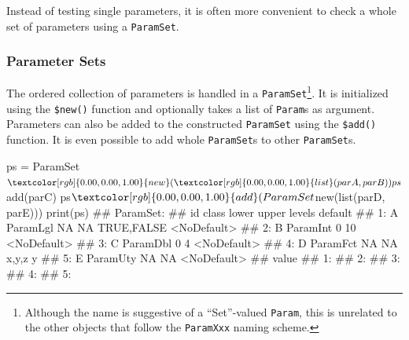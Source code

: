\documentclass[12pt,]{scrbook}
\newenvironment{Shaded}{}{}
\newcommand{\KeywordTok}[1]{\textcolor[rgb]{0.00,0.00,1.00}{#1}}
\newcommand{\NormalTok}[1]{#1}
\newcommand{\OperatorTok}[1]{#1}
\newcommand{\OtherTok}[1]{\textcolor[rgb]{1.00,0.25,0.00}{#1}}
\newcommand{\StringTok}[1]{\textcolor[rgb]{0.00,0.50,0.50}{#1}}
\begin{document}
\begin{Shaded}
\end{Shaded}

Instead of testing single parameters, it is often more convenient to check a whole set of parameters using a \texttt{ParamSet}.

\hypertarget{parameter-sets}{%
\subsubsection{Parameter Sets}\label{parameter-sets}}

The ordered collection of parameters is handled in a \texttt{ParamSet}\footnote{Although the name is suggestive of a ``Set''-valued \texttt{Param}, this is unrelated to the other objects that follow the \texttt{ParamXxx} naming scheme.}.
It is initialized using the \texttt{\$new()} function and optionally takes a list of \texttt{Param}s as argument.
Parameters can also be added to the constructed \texttt{ParamSet} using the \texttt{\$add()} function.
It is even possible to add whole \texttt{ParamSet}s to other \texttt{ParamSet}s.

\begin{Shaded}
\begin{Highlighting}[]
\NormalTok{ps =}\StringTok{ }\NormalTok{ParamSet}\OperatorTok{$}\KeywordTok{new}\NormalTok{(}\KeywordTok{list}\NormalTok{(parA, parB))}
\NormalTok{ps}\OperatorTok{$}\KeywordTok{add}\NormalTok{(parC)}
\NormalTok{ps}\OperatorTok{$}\KeywordTok{add}\NormalTok{(ParamSet}\OperatorTok{$}\KeywordTok{new}\NormalTok{(}\KeywordTok{list}\NormalTok{(parD, parE)))}
\KeywordTok{print}\NormalTok{(ps)}
\NormalTok{## ParamSet: }
\NormalTok{##    id    class lower upper      levels     default}
\NormalTok{## 1:  A ParamLgl    NA    NA  TRUE,FALSE <NoDefault>}
\NormalTok{## 2:  B ParamInt     0    10             <NoDefault>}
\NormalTok{## 3:  C ParamDbl     0     4             <NoDefault>}
\NormalTok{## 4:  D ParamFct    NA    NA       x,y,z           y}
\NormalTok{## 5:  E ParamUty    NA    NA             <NoDefault>}
\NormalTok{##    value}
\NormalTok{## 1:      }
\NormalTok{## 2:      }
\NormalTok{## 3:      }
\NormalTok{## 4:      }
\NormalTok{## 5:}
\end{Highlighting}
\end{Shaded}
\end{document}
